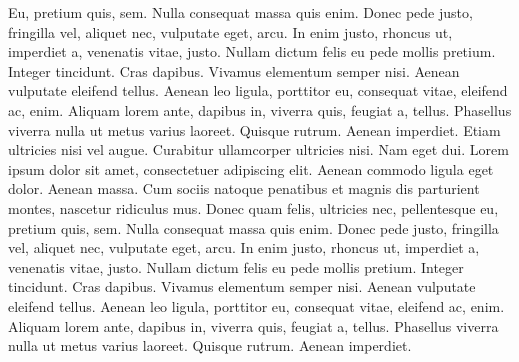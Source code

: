 \documentclass[
    12pt,
    letterpaper,
    oneside,
    noraggedright
]{turabian-researchpaper}
\begin{document}
Eu, pretium quis, sem. Nulla consequat massa quis enim. Donec pede
justo, fringilla vel, aliquet nec, vulputate eget, arcu. In enim justo,
rhoncus ut, imperdiet a, venenatis vitae, justo. Nullam dictum felis eu
pede mollis pretium. Integer tincidunt. Cras dapibus. Vivamus elementum
semper nisi. Aenean vulputate eleifend tellus. Aenean leo ligula,
porttitor eu, consequat vitae, eleifend ac, enim. Aliquam lorem ante,
dapibus in, viverra quis, feugiat a, tellus. Phasellus viverra nulla ut
metus varius laoreet. Quisque rutrum. Aenean imperdiet. Etiam ultricies
nisi vel augue. Curabitur ullamcorper ultricies nisi. Nam eget dui.
Lorem ipsum dolor sit amet, consectetuer adipiscing elit. Aenean commodo
ligula eget dolor. Aenean massa. Cum sociis natoque penatibus et magnis
dis parturient montes, nascetur ridiculus mus. Donec quam felis,
ultricies nec, pellentesque eu, pretium quis, sem. Nulla consequat massa
quis enim. Donec pede justo, fringilla vel, aliquet nec, vulputate eget,
arcu. In enim justo, rhoncus ut, imperdiet a, venenatis vitae, justo.
Nullam dictum felis eu pede mollis pretium. Integer tincidunt. Cras
dapibus. Vivamus elementum semper nisi. Aenean vulputate eleifend
tellus. Aenean leo ligula, porttitor eu, consequat vitae, eleifend ac,
enim. Aliquam lorem ante, dapibus in, viverra quis, feugiat a, tellus.
Phasellus viverra nulla ut metus varius laoreet. Quisque rutrum. Aenean
imperdiet.
\end{document}
